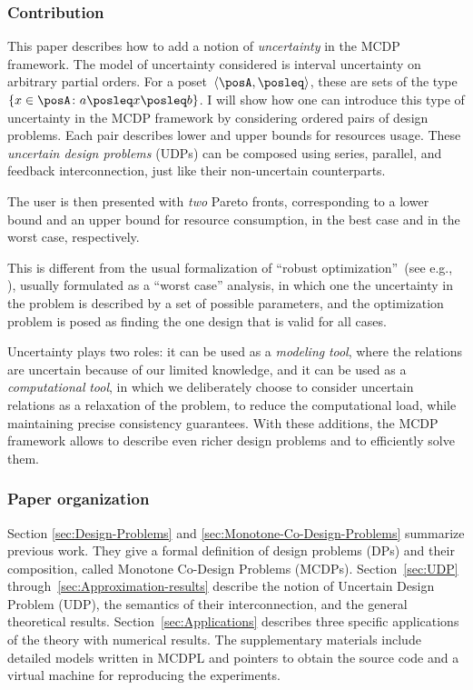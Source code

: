 \subsubsection*{Contribution}

This paper describes how to add a notion of \emph{uncertainty} in
the MCDP framework.
The model of uncertainty considered is interval
uncertainty on arbitrary partial orders.
For a poset~$\left\langle \posA,\posleq\right\rangle $,
these are sets of the type~$\{x\in\posA\colon a\posleq x\posleq b\}$.
I will show how one can introduce this type of uncertainty in the
MCDP framework by considering ordered pairs of design problems.
Each
pair describes lower and upper bounds for resources usage.
These \emph{uncertain
design problems} (UDPs) can be composed using series, parallel, and
feedback interconnection, just like their non-uncertain counterparts.

The user is then presented with \emph{two} Pareto fronts, corresponding
to a lower bound and an upper bound for resource consumption, in the
best case and in the worst case, respectively.

This is different from the usual formalization of ``robust optimization''~(see
e.g., \cite{bertsimas11theory,ben-tal09}), usually formulated as
a ``worst case'' analysis, in which one the uncertainty in the problem
is described by a set of possible parameters, and the optimization
problem is posed as finding the one design that is valid for all cases.

Uncertainty plays two roles: it can be used as a \emph{modeling} \emph{tool},
where the relations are uncertain because of our limited knowledge,
and it can be used as a \emph{computational} \emph{tool}, in which
we deliberately choose to consider uncertain relations as a relaxation
of the problem, to reduce the computational load, while maintaining
precise consistency guarantees. With these additions, the MCDP framework
allows to describe even richer design problems and to efficiently
solve them.


\subsubsection*{Paper organization}

Section \ref{sec:Design-Problems} and \ref{sec:Monotone-Co-Design-Problems}
summarize previous work. They give a formal definition of design problems
(DPs) and their composition, called Monotone Co-Design Problems (MCDPs).
Section~\ref{sec:UDP} through~\ref{sec:Approximation-results}
describe the notion of Uncertain Design Problem (UDP), the semantics
of their interconnection, and the general theoretical results. Section~\ref{sec:Applications}
describes three specific applications of the theory with numerical
results. The supplementary materials include detailed models written
in MCDPL and pointers to obtain the source code and a virtual machine
for reproducing the experiments.


